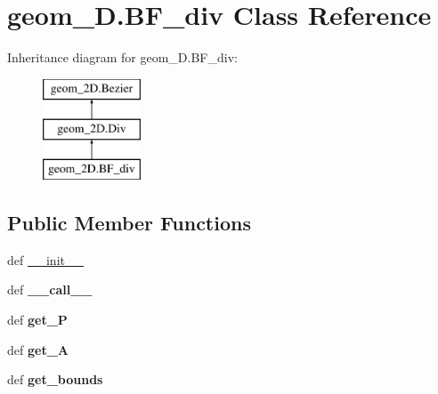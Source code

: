 \hypertarget{classgeom__2D_1_1BF__div}{\section{geom\-\_\-D.\-B\-F\-\_\-div \-Class \-Reference}
\label{classgeom__2D_1_1BF__div}
}
\-Inheritance diagram for geom\-\_\-D.\-B\-F\-\_\-div\-:\begin{figure}[H]
\begin{center}
\leavevmode
\includegraphics[height=3.000000cm]{classgeom__2D_1_1BF__div}
\end{center}
\end{figure}
\subsection*{\-Public \-Member \-Functions}
\begin{DoxyCompactItemize}
\item 
def \hyperlink{classgeom__2D_1_1BF__div_aaa1d864d0feadf18fb1848929ae2e6fd}{\-\_\-\-\_\-init\-\_\-\-\_\-}
\item 
\hypertarget{classgeom__2D_1_1BF__div_a17f5026ec01f75aff003d08f236c08c2}{def {\bfseries \-\_\-\-\_\-call\-\_\-\-\_\-}}\label{classgeom__2D_1_1BF__div_a17f5026ec01f75aff003d08f236c08c2}

\item 
\hypertarget{classgeom__2D_1_1BF__div_ac7542314ee6bb318cd8ad621d2ab2e72}{def {\bfseries get\-\_\-\-P}}\label{classgeom__2D_1_1BF__div_ac7542314ee6bb318cd8ad621d2ab2e72}

\item 
\hypertarget{classgeom__2D_1_1BF__div_a8cb77aa5cc80d09442e7026c43fb83eb}{def {\bfseries get\-\_\-\-A}}\label{classgeom__2D_1_1BF__div_a8cb77aa5cc80d09442e7026c43fb83eb}

\item 
\hypertarget{classgeom__2D_1_1BF__div_a9430bb46fcb27cd2caaf01710a09e944}{def {\bfseries get\-\_\-bounds}}\label{classgeom__2D_1_1BF__div_a9430bb46fcb27cd2caaf01710a09e944}

\end{DoxyCompactItemize}


